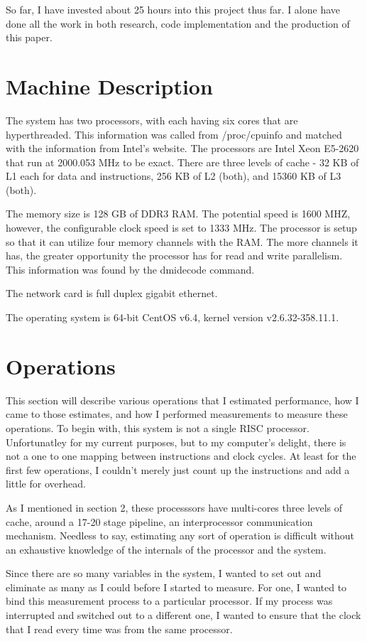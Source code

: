 \documentclass[paper=a4, fontsize=11pt]{scrartcl}
\numberwithin{equation}{section}		%
\numberwithin{figure}{section}			%
\numberwithin{table}{section}				%
\begin{document}
So far, I have invested about 25 hours into this project thus far.  I alone have done all the work in both research, code implementation and the production of this paper.

\section{Machine Description}

The system has two processors, with each having six cores that are hyperthreaded.  This information was called from /proc/cpuinfo and matched with the information from Intel's website.  The processors are Intel Xeon E5-2620 that run at 2000.053 MHz to be exact.  There are three levels of cache - 32 KB of L1 each for data and instructions, 256 KB of L2 (both), and 15360 KB of L3 (both).  

The memory size is 128 GB of DDR3 RAM.  The potential speed is 1600 MHZ, however, the configurable clock speed is set to 1333 MHz.  The processor is setup so that it can utilize four memory channels with the RAM.  The more channels it has, the greater opportunity the processor has for read and write parallelism.  This information was found by the dmidecode command.

The network card is full duplex gigabit ethernet.

The operating system is 64-bit CentOS v6.4, kernel version v2.6.32-358.11.1.

\section{Operations}
This section will describe various operations that I estimated performance, how I came to those estimates, and how I performed measurements to measure these operations.  To begin with, this system is not a single RISC processor.  Unfortunatley for my current purposes, but to my computer's delight, there is not a one to one mapping between instructions and clock cycles.  At least for the first few operations, I couldn't merely just count up the instructions and add a little for overhead.

As I mentioned in section 2, these processsors have multi-cores three levels of cache, around a 17-20 stage pipeline, an interprocessor communication mechanism.  Needless to say, estimating any sort of operation is difficult without an exhaustive knowledge of the internals of the processor and the system.

Since there are so many variables in the system, I wanted to set out and eliminate as many as I could before I started to measure.  For one, I wanted to bind this measurement process to a particular processor.  If my process was interrupted and switched out to a different one, I wanted to ensure that the clock that I read every time was from the same processor.
\end{document}
